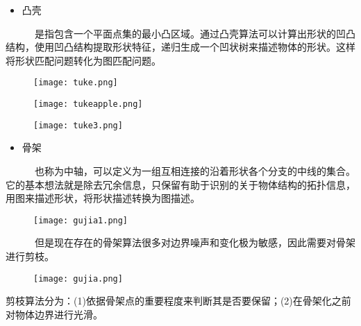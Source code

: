 \documentclass[notheorems,mathserif,table,compress]{beamer}  %
\begin{document}
\begin{frame}
  \begin{itemize}
   \item 凸壳\\ 
  \end{itemize}
~~~~~~是指包含一个平面点集的最小凸区域。通过凸壳算法可以计算出形状的凹凸结构，使用凹凸结构提取形状特征，递归生成一个凹状树来描述物体的形状。这样将形状匹配问题转化为图匹配问题。\\ 
   \begin{figure}[!ht]
    \centering
    \texttt{[image: tuke.png]}
   \end{figure}
   \begin{figure}
    \begin{minipage}{0.3\textwidth}
    \centering
    \texttt{[image: tukeapple.png]}
    \end{minipage}
    \begin{minipage}{0.3\textwidth}
    \centering
    \texttt{[image: tuke3.png]}
    \end{minipage}
   \end{figure}
\end{frame}

\begin{frame}
  \begin{itemize}
   \item 骨架\\ 
  \end{itemize}
   ~~~~~~也称为中轴，可以定义为一组互相连接的沿着形状各个分支的中线的集合。它的基本想法就是除去冗余信息，只保留有助于识别的关于物体结构的拓扑信息，用图来描述形状，将形状描述转换为图描述。\\
   \begin{figure}[!ht]
    \centering
    \texttt{[image: gujia1.png]}
   \end{figure}
\end{frame}

\begin{frame}
  \begin{tcolorbox}[colback=red!5,colframe=blue!75!black]
~~~~~~但是现在存在的骨架算法很多对边界噪声和变化极为敏感，因此需要对骨架进行剪枝。
   \begin{figure}[!ht]
    \centering
    \texttt{[image: gujia.png]}
   \end{figure}
剪枝算法分为：(1)依据骨架点的重要程度来判断其是否要保留；(2)在骨架化之前对物体边界进行光滑。 
  \end{tcolorbox}
\end{frame}
\end{document}
